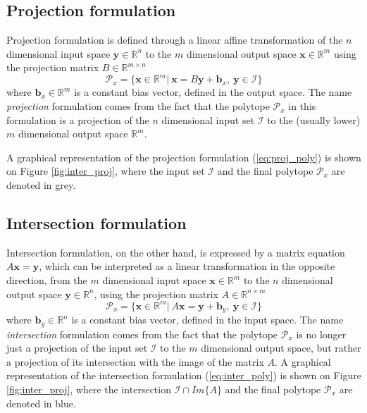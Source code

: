 \subsection{Projection formulation}
\label{ch:proj_formulaiton}
Projection formulation is defined through a linear affine transformation of the $n$ dimensional input space $\bm{y}\in\mathbb{R}^n$ to the $m$ dimensional output space $\bm{x}\in\mathbb{R}^m$ using the projection matrix $B\in \mathbb{R}^{m\times n}$
\begin{equation}
    \mathcal{P}_x=\{\bm{x}\in \mathbb{R}^m |~ \bm{x} = B\bm{y} + \bm{b}_x,~\bm{y} \in\mathcal{I} \}
    \label{eq:proj_poly}
\end{equation}
where $\bm{b}_x\in\mathbb{R}^m$ is a constant bias vector, defined in the output space. The name \textit{projection} formulation comes from the fact that the polytope $\mathcal{P}_x$ in this formulation is a projection of the $n$ dimensional input set $\mathcal{I}$ to the (usually lower) $m$ dimensional output space $\mathbb{R}^m$.

A graphical representation of the projection formulation (\ref{eq:proj_poly}) is shown on Figure \ref{fig:inter_proj}, where the input set $\mathcal{I}$ and the final polytope $\mathcal{P}_x$ are denoted in grey.


\subsection{Intersection formulation}
\label{ch:inter_formulaiton}
Intersection formulation, on the other hand, is expressed by a matrix equation $A\bm{x}=\bm{y}$, which can be interpreted as a linear transformation in the opposite direction\cite{LARSON2013}, from the $m$ dimensional input space $\bm{x}\in\mathbb{R}^m$ to the $n$ dimensional output space $\bm{y}\in\mathbb{R}^n$, using the projection matrix $A\in \mathbb{R}^{n\times m }$
\begin{equation}
    \mathcal{P}_x=\{\bm{x} \in \mathbb{R}^m|~ A\bm{x} = \bm{y}+ \bm{b}_y,~ \bm{y} \in \mathcal{I}\}
    \label{eq:inter_poly}
\end{equation}
where $\bm{b}_y \in \mathbb{R}^n$ is a constant bias vector, defined in the input space. The name \textit{intersection} formulation comes from the fact that the polytope $\mathcal{P}_x$ is no longer just a projection of the input set $\mathcal{I}$ to the $m$ dimensional output space, but rather a projection of its intersection with the image of the matrix $A$. 
A graphical representation of the intersection formulation (\ref{eq:inter_poly}) is shown on Figure \ref{fig:inter_proj}, where the intersection $\mathcal{I}\cap Im\{A\}$ and the final polytope $\mathcal{P}_x$ are denoted in blue.

